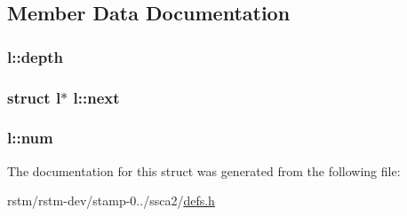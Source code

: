 \subsection{Member Data Documentation}
\hypertarget{structl_ad178d1f0ccdeae3fede5d0cbf6b3ba34}{
\subsubsection[{depth}]{ l\-::depth}}\label{structl_ad178d1f0ccdeae3fede5d0cbf6b3ba34}
\hypertarget{structl_a304ca9c94026094f5dc7a8ac5f79e65a}{
\subsubsection[{next}]{\setlength{\rightskip}{0pt plus 5cm}struct {\bf l}$\ast$ l\-::next}}\label{structl_a304ca9c94026094f5dc7a8ac5f79e65a}
\hypertarget{structl_a24f894f7c4a5b30db843077b31cc1d59}{
\subsubsection[{num}]{ l\-::num}}\label{structl_a24f894f7c4a5b30db843077b31cc1d59}


The documentation for this struct was generated from the following file\-:\begin{DoxyCompactItemize}
\item 
rstm/rstm-\/dev/stamp-\/0../ssca2/\hyperlink{defs_8h}{defs.\-h}\end{DoxyCompactItemize}
